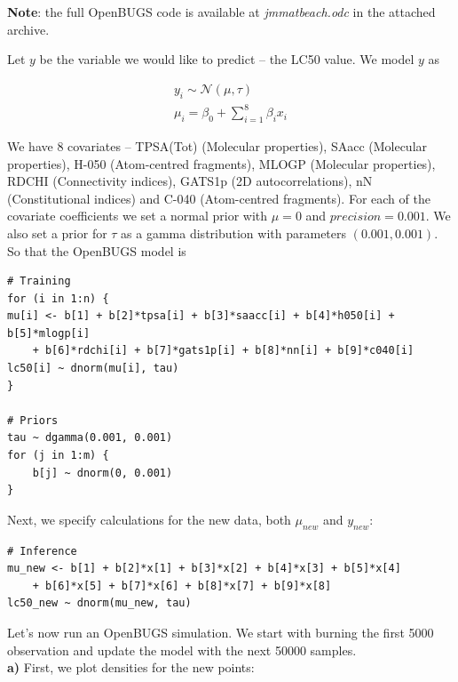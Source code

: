 \documentclass[a4 paper]{article}
\begin{document}
\textbf{Note}: the full OpenBUGS code is available 
at \textit{jmmatbeach.odc}
in the attached archive. \\ 

 






Let $y$ be the variable we would like to 
predict -- the LC50 value. We model $y$ as

\begin{align*}
y_{i}\sim\mathcal{N}\left(\mu,\tau\right)  \\
\mu_{i}=\beta_{0}+\sum_{i=1}^{8}\beta_{i}x_{i}
\end{align*}

We have 8 covariates -- TPSA(Tot) (Molecular properties), SAacc (Molecular properties), H-050 (Atom-centred fragments), MLOGP (Molecular properties), RDCHI (Connectivity indices), GATS1p (2D autocorrelations), nN (Constitutional indices) and C-040 (Atom-centred fragments). 
For each of the covariate coefficients we set a 
normal prior with $\mu=0$ and $precision=0.001$.
We also set a prior for $\tau$ as a gamma distribution
with parameters $(0.001, 0.001)$.
So that the OpenBUGS model is 

\begin{Verbatim}
# Training
for (i in 1:n) {
mu[i] <- b[1] + b[2]*tpsa[i] + b[3]*saacc[i] + b[4]*h050[i] + b[5]*mlogp[i] 
	+ b[6]*rdchi[i] + b[7]*gats1p[i] + b[8]*nn[i] + b[9]*c040[i]
lc50[i] ~ dnorm(mu[i], tau)
}

# Priors
tau ~ dgamma(0.001, 0.001)
for (j in 1:m) {
	b[j] ~ dnorm(0, 0.001)
}
\end{Verbatim}

Next, we specify calculations 
for the new data, both $\mu_{new}$
and $y_{new}$:

\begin{Verbatim}
# Inference
mu_new <- b[1] + b[2]*x[1] + b[3]*x[2] + b[4]*x[3] + b[5]*x[4] 
	+ b[6]*x[5] + b[7]*x[6] + b[8]*x[7] + b[9]*x[8]
lc50_new ~ dnorm(mu_new, tau)
\end{Verbatim}

Let's now run an OpenBUGS simulation. We start 
with burning 
the first 5000 observation and update the model 
with the next 50000 samples. \\

\textbf{a)} First, we plot 
densities for the new points:
\end{document}
